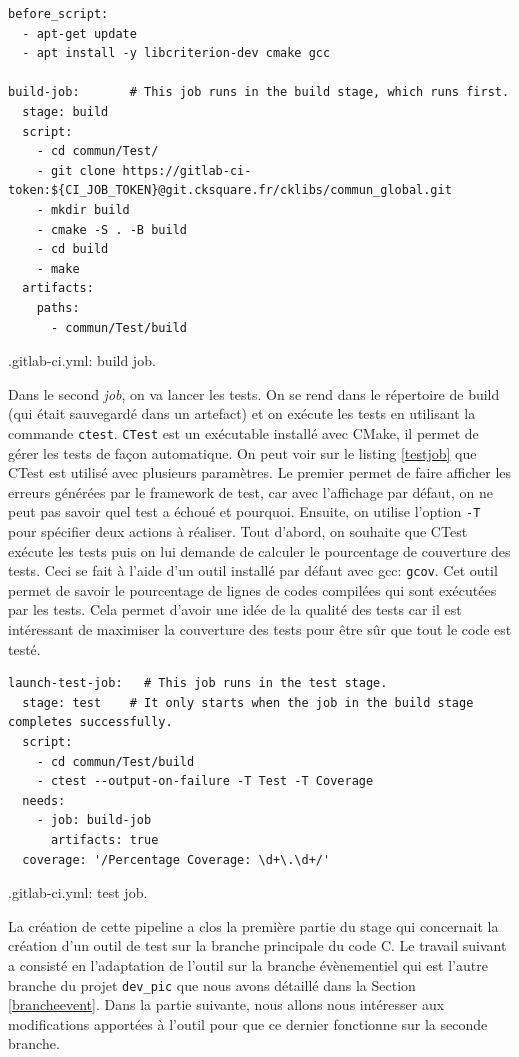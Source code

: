 \documentclass[a4paper]{article}
\begin{document}
\begin{listing}[ht!]
\begin{verbatim}
before_script:
  - apt-get update
  - apt install -y libcriterion-dev cmake gcc

build-job:       # This job runs in the build stage, which runs first.
  stage: build
  script:
    - cd commun/Test/
    - git clone https://gitlab-ci-token:${CI_JOB_TOKEN}@git.cksquare.fr/cklibs/commun_global.git
    - mkdir build
    - cmake -S . -B build
    - cd build
    - make
  artifacts:
    paths:
      - commun/Test/build
\end{verbatim}
\caption{.gitlab-ci.yml: build job.}
\label{buildjob}
\end{listing}

Dans le second \textit{job}, on va lancer les tests. On se rend dans le
répertoire de build (qui était sauvegardé dans un artefact) et on exécute les tests
en utilisant la commande \verb|ctest|. \verb|CTest| est un exécutable
installé avec CMake, il permet de gérer les tests de façon automatique. On peut
voir sur le listing \ref{testjob} que CTest est utilisé avec plusieurs
paramètres. Le premier permet de faire afficher les erreurs générées par le
framework de test, car avec l'affichage par défaut, on ne peut pas savoir quel
test a échoué et pourquoi. Ensuite, on utilise l'option \verb|-T| pour spécifier
deux actions à réaliser. Tout d'abord, on souhaite que CTest exécute les tests
puis on lui demande de calculer le pourcentage de couverture des tests.
Ceci se fait à l'aide d'un outil installé par défaut avec gcc: \verb|gcov|. Cet
outil permet de savoir le pourcentage de lignes de codes compilées qui sont
exécutées par les tests. Cela permet d'avoir une idée de la qualité des tests
car il est intéressant de maximiser la couverture des tests pour être sûr que
tout le code est testé.

\begin{listing}[ht!]
\begin{verbatim}
launch-test-job:   # This job runs in the test stage.
  stage: test    # It only starts when the job in the build stage completes successfully.
  script:
    - cd commun/Test/build
    - ctest --output-on-failure -T Test -T Coverage
  needs:
    - job: build-job
      artifacts: true
  coverage: '/Percentage Coverage: \d+\.\d+/'
\end{verbatim}
\caption{.gitlab-ci.yml: test job.}
\label{testjob}
\end{listing}

La création de cette pipeline a clos la première partie du stage qui concernait
la création d'un outil de test sur la branche principale du code C. Le travail
suivant a consisté en l'adaptation de l'outil sur la branche évènementiel qui
est l'autre branche du projet \verb|dev_pic| que nous avons détaillé dans la
Section \ref{brancheevent}. Dans la partie suivante, nous allons nous intéresser
aux modifications apportées à l'outil pour que ce dernier fonctionne sur la
seconde branche.
\end{document}
